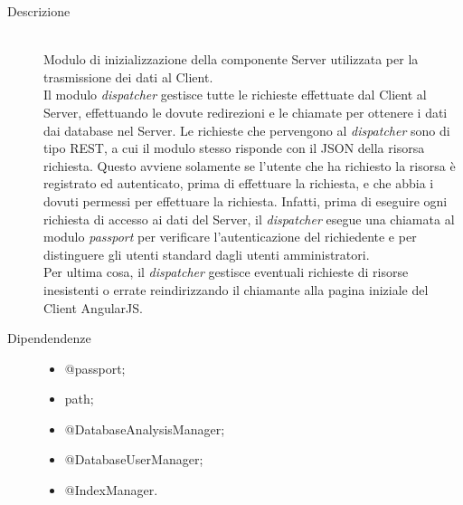 \begin{description}
 \item[Descrizione] \hfill \\
Modulo di inizializzazione della componente Server utilizzata per la trasmissione dei dati al Client. \\
Il modulo \textit{dispatcher} gestisce tutte le richieste effettuate dal Client al Server, effettuando le dovute redirezioni e le chiamate per ottenere i dati dai database nel Server. Le richieste che pervengono al 
\textit{dispatcher} sono di tipo REST, a cui il modulo stesso risponde con il JSON della risorsa richiesta. 
Questo avviene solamente se l'utente che ha richiesto la risorsa è registrato ed autenticato, prima di 
effettuare la richiesta, e che abbia i dovuti permessi per effettuare la richiesta. Infatti, prima di eseguire ogni richiesta di accesso ai dati del Server, il \textit{dispatcher} esegue una chiamata al modulo \textit{passport} per verificare l'autenticazione del richiedente e per distinguere gli utenti standard dagli utenti amministratori. \\
Per ultima cosa, il \textit{dispatcher} gestisce eventuali richieste di risorse inesistenti o errate reindirizzando il chiamante alla pagina iniziale del Client AngularJS.
 \item[Dipendendenze] \hfill
 \begin{itemize}
 \item @passport;
 \item path;
 \item @DatabaseAnalysisManager;
 \item @DatabaseUserManager;
 \item @IndexManager.
 \end{itemize}
 

\end{description}
